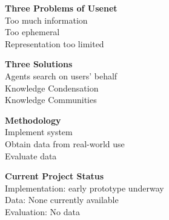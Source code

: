 \begin{itemizenoindent}
\item  {\bf Three Problems of Usenet}\\
 Too much information\\
 Too ephemeral\\
 Representation too limited\\

\item {\bf Three Solutions}\\
 Agents search on users' behalf\\
 Knowledge Condensation\\
 Knowledge Communities\\

\item {\bf Methodology}\\
 Implement system\\
 Obtain data from real-world use\\
 Evaluate data\\

\item {\bf Current Project Status}\\
 Implementation: early prototype underway\\
 Data: None currently available\\
 Evaluation: No data\\
\end{itemizenoindent}

\newpage
